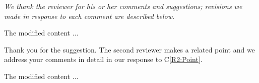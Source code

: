 \documentclass[12pt]{article}
\begin{document}
\textit{We thank the reviewer for his or her comments and suggestions;
revisions we made in response to each comment are described below.}

\begin{comment}
	\lipsum[2]
	\label{R2:Point}
\end{comment}

\begin{response}
	\lipsum[3]
\end{response}

\begin{recompose}
	The modified content ...
\end{recompose}  

\begin{comment}
	\lipsum[11]
\end{comment}

\begin{response}
Thank you for the suggestion. The second reviewer makes a related point and we address your comments in detail in our response to C\ref{R2:Point}.
\end{response}

\begin{recompose}
	The modified content ...
\end{recompose} 
\end{document}
